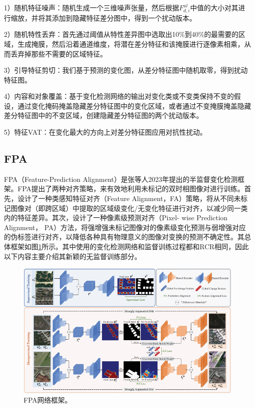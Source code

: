 \documentclass[lang=chs, degree=master, blindreview=false, adobe=false]{yanputhesis}
\begin{document}
1）随机特征噪声：随机生成一个三维噪声张量，然后根据$F_{d, i}^{u l}$中值的大小对其进行缩放，并将其添加到隐藏特征差分图中，得到一个扰动版本。

2）随机特性丢弃：首先通过阈值从特性差异图中选取出10$\%$到40$\%$的最需要的区域，生成掩膜，然后沿着通道维度，将潜在差分特征和该掩膜进行逐像素相乘，从而丢弃掉那些不需要的区域特征。

3）引导特征剪切：我们基于预测的变化图，从差分特征图中随机取零，得到扰动特征图。

4）内容和对象覆盖：基于变化检测网络的输出对变化类或不变类保持不变的假设，通过变化掩码掩盖隐藏差分特征图中的变化区域，或者通过不变掩膜掩盖隐藏差分特征图中的不变区域，创建隐藏差分特征图的两个扰动版本。

5）特征VAT\cite{2019VAT}：在变化最大的方向上对差分特征图应用对抗性扰动。
\subsection{FPA}
FPA（Feature-Prediction Alignment）是张等人\cite{Zhang2023FPA}2023年提出的半监督变化检测框架。FPA提出了两种对齐策略，来有效地利用未标记的双时相图像对进行训练。首先，设计了一种类感知特征对齐（Feature Alignment，FA）策略，将从不同未标记图像对（即跨区域）中提取的区域级变化/无变化特征进行对齐，以减少同一类内的特征差异。其次，设计了一种像素级预测对齐（Pixel- wise Prediction Alignment， PA）方法，将强增强未标记图像对的像素级变化预测与弱增强对应的伪标签进行对齐，以降低各种具有物理意义的图像对变换的预测不确定性。其总体框架如图\ref{fig:FPAfram}所示。其中使用的变化检测网络和监督训练过程都和RCR\cite{bandara2022RCR}相同，因此以下内容主要介绍其新颖的无监督训练部分。
\begin{figure}[htb]
  \centering
  \includegraphics[scale=0.55]{images/FPAframe.png}
  \caption{
    FPA网络框架\cite{Zhang2023FPA}。
  }
  \label{fig:FPAfram}
\end{figure}
\end{document}
